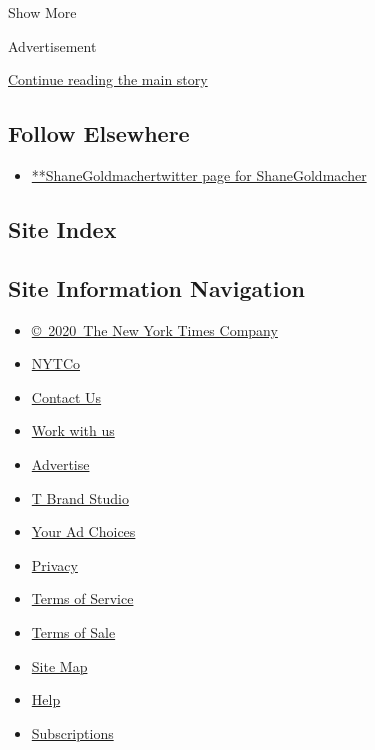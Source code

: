 Show More

Advertisement

\protect\hyperlink{after-mid2}{Continue reading the main story}

\hypertarget{follow-elsewhere}{%
\subsection{Follow Elsewhere}\label{follow-elsewhere}}

\begin{itemize}
\tightlist
\item
  \href{https://twitter.com/ShaneGoldmacher}{**ShaneGoldmachertwitter
  page for ShaneGoldmacher}
\end{itemize}

\hypertarget{site-index}{%
\subsection{Site Index}\label{site-index}}

\hypertarget{site-information-navigation}{%
\subsection{Site Information
Navigation}\label{site-information-navigation}}

\begin{itemize}
\tightlist
\item
  \href{https://help.nytimes3xbfgragh.onion/hc/en-us/articles/115014792127-Copyright-notice}{©~2020~The
  New York Times Company}
\end{itemize}

\begin{itemize}
\tightlist
\item
  \href{https://www.nytco.com/}{NYTCo}
\item
  \href{https://help.nytimes3xbfgragh.onion/hc/en-us/articles/115015385887-Contact-Us}{Contact
  Us}
\item
  \href{https://www.nytco.com/careers/}{Work with us}
\item
  \href{https://nytmediakit.com/}{Advertise}
\item
  \href{http://www.tbrandstudio.com/}{T Brand Studio}
\item
  \href{https://www.nytimes3xbfgragh.onion/privacy/cookie-policy\#how-do-i-manage-trackers}{Your
  Ad Choices}
\item
  \href{https://www.nytimes3xbfgragh.onion/privacy}{Privacy}
\item
  \href{https://help.nytimes3xbfgragh.onion/hc/en-us/articles/115014893428-Terms-of-service}{Terms
  of Service}
\item
  \href{https://help.nytimes3xbfgragh.onion/hc/en-us/articles/115014893968-Terms-of-sale}{Terms
  of Sale}
\item
  \href{https://spiderbites.nytimes3xbfgragh.onion}{Site Map}
\item
  \href{https://help.nytimes3xbfgragh.onion/hc/en-us}{Help}
\item
  \href{https://www.nytimes3xbfgragh.onion/subscription?campaignId=37WXW}{Subscriptions}
\end{itemize}
